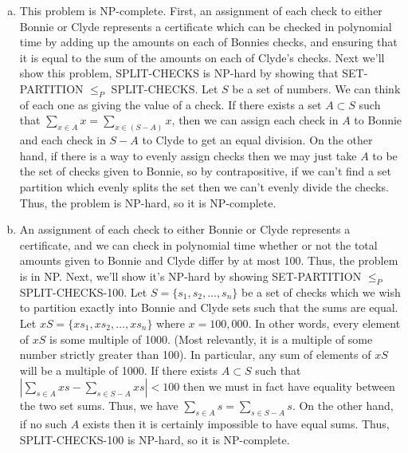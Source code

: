 \documentclass{article}
\begin{document}
\begin{enumerate}[a.]
\item This problem is NP-complete.  First, an assignment of each check to either Bonnie or Clyde represents a certificate which can be checked in polynomial time by adding up the amounts on each of Bonnies checks, and ensuring that it is equal to the sum of the amounts on each of Clyde's checks.  Next we'll show this problem, SPLIT-CHECKS is NP-hard by showing that SET-PARTITION $\leq_P$ SPLIT-CHECKS.  Let $S$ be a set of numbers. We can think of each one as giving the value of a check.  If there exists a set $A \subset S$ such that $\sum_{x \in A} x = \sum_{x \in (S-A)} x$, then we can assign each check in $A$ to Bonnie and each check in $S-A$ to Clyde to get an equal division.  On the other hand, if there is a way to evenly assign checks then we may just take $A$ to be the set of checks given to Bonnie, so by contrapositive, if we can't find a set partition which evenly splits the set then we can't evenly divide the checks.  Thus, the problem is NP-hard, so it is NP-complete. 

\item An assignment of each check to either Bonnie or Clyde represents a certificate, and we can check in polynomial time whether or not the total amounts given to Bonnie and Clyde differ by at most 100.  Thus, the problem is in NP.  Next, we'll show it's NP-hard by showing SET-PARTITION $\leq_P$ SPLIT-CHECKS-100.  Let $S = \{s_1, s_2, \ldots, s_n\}$ be a set of checks which we wish to partition exactly into Bonnie and Clyde sets such that the sums are equal.  Let $xS = \{xs_1, xs_2, \ldots, xs_n\}$ where $x = 100,000$.  In other words, every element of $xS$ is some multiple of 1000.  (Most relevantly, it is a multiple of some number strictly greater than 100).  In particular, any sum of elements of $xS$ will be a multiple of 1000.  If there exists $A \subset S$ such that $\left|\sum_{s \in A} xs - \sum_{s \in S-A} xs\right| < 100$ then we must in fact have equality between the two set sums. Thus, we have $\sum_{s \in A} s = \sum_{s \in S-A} s$.  On the other hand, if no such $A$ exists then it is certainly impossible to have equal sums.  Thus, SPLIT-CHECKS-100 is NP-hard, so it is NP-complete.
\end{enumerate}
\end{document}
